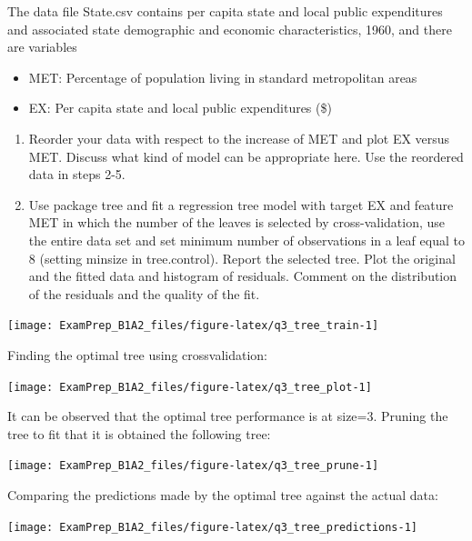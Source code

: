 \documentclass[
]{article}
\providecommand{\tightlist}{%
  \setlength{\itemsep}{0pt}\setlength{\parskip}{0pt}}
\begin{document}
The data file State.csv contains per capita state and local public
expenditures and associated state demographic and economic
characteristics, 1960, and there are variables

\begin{itemize}
\tightlist
\item
  MET: Percentage of population living in standard metropolitan areas
\item
  EX: Per capita state and local public expenditures (\$)
\end{itemize}

\begin{enumerate}
\def\labelenumi{\arabic{enumi}.}
\item
  Reorder your data with respect to the increase of MET and plot EX
  versus MET. Discuss what kind of model can be appropriate here. Use
  the reordered data in steps 2-5.
\item
  Use package tree and fit a regression tree model with target EX and
  feature MET in which the number of the leaves is selected by
  cross-validation, use the entire data set and set minimum number of
  observations in a leaf equal to 8 (setting minsize in tree.control).
  Report the selected tree. Plot the original and the fitted data and
  histogram of residuals. Comment on the distribution of the residuals
  and the quality of the fit.
\end{enumerate}

\begin{center}\texttt{[image: ExamPrep\_B1A2\_files/figure-latex/q3\_tree\_train-1]} \end{center}

Finding the optimal tree using crossvalidation:

\begin{center}\texttt{[image: ExamPrep\_B1A2\_files/figure-latex/q3\_tree\_plot-1]} \end{center}

It can be observed that the optimal tree performance is at size=3.
Pruning the tree to fit that it is obtained the following tree:

\begin{center}\texttt{[image: ExamPrep\_B1A2\_files/figure-latex/q3\_tree\_prune-1]} \end{center}

Comparing the predictions made by the optimal tree against the actual
data:

\begin{center}\texttt{[image: ExamPrep\_B1A2\_files/figure-latex/q3\_tree\_predictions-1]} \end{center}
\end{document}
